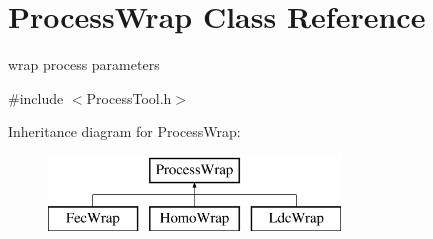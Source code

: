 \hypertarget{class_process_wrap}{}\section{Process\+Wrap Class Reference}
\label{class_process_wrap}


wrap process parameters  




{\ttfamily \#include $<$Process\+Tool.\+h$>$}

Inheritance diagram for Process\+Wrap\+:\begin{figure}[H]
\begin{center}
\leavevmode
\includegraphics[height=2.000000cm]{class_process_wrap}
\end{center}
\end{figure}
